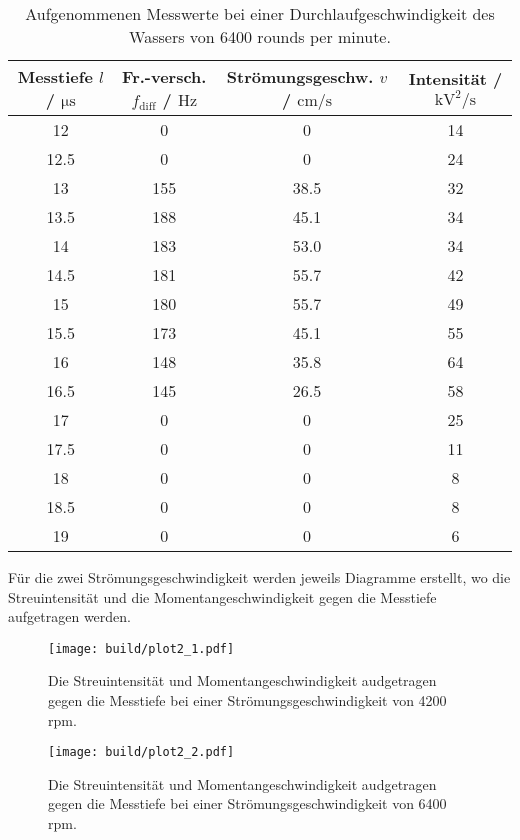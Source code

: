 \begin{table}
  \centering
  \begin{tabular}{c | c | c | c}
    \toprule
    Messtiefe $l$ / $\si{\micro\second}$ & Fr.-versch. $f_{\mathrm{diff}}$ / $\si{\hertz}$ & Strömungsgeschw. $v$ / $\si{\centi\meter\per\second}$ & Intensität / $\si{\kilo\volt\squared\per\second}$ \\
    \midrule
    12          &    0      &     0          &     14\\
    12.5        &    0      &     0          &     24\\
    13          &    155    &     38.5       &     32\\
    13.5        &    188    &     45.1       &     34\\
    14          &    183    &     53.0       &     34\\
    14.5        &    181    &     55.7       &     42\\
    15          &    180    &     55.7       &     49\\
    15.5        &    173    &     45.1       &     55\\
    16          &    148    &     35.8       &     64\\
    16.5        &    145    &     26.5       &     58\\          
    17          &    0      &     0          &     25\\
    17.5        &    0     &      0          &     11\\
    18          &    0     &      0          &     8\\
    18.5        &    0     &      0          &     8\\
    19          &    0     &      0          &     6\\
    \bottomrule
  \end{tabular}
  \caption{Aufgenommenen Messwerte bei einer Durchlaufgeschwindigkeit des Wassers von 6400 rounds per minute.}
  \label{tab:Teil2_70}
\end{table}

Für die zwei Strömungsgeschwindigkeit werden jeweils Diagramme erstellt, wo die Streuintensität
und die Momentangeschwindigkeit gegen die Messtiefe aufgetragen werden.\\

\begin{figure}
  \centering
  \texttt{[image: build/plot2\_1.pdf]}
  \caption{Die Streuintensität und Momentangeschwindigkeit audgetragen gegen die Messtiefe bei
  einer Strömungsgeschwindigkeit von 4200 rpm.}
  \label{fig:stroemung}
\end{figure}

\begin{figure}
  \centering
  \texttt{[image: build/plot2\_2.pdf]}
  \caption{Die Streuintensität und Momentangeschwindigkeit audgetragen gegen die Messtiefe bei
  einer Strömungsgeschwindigkeit von 6400 rpm.}
  \label{fig:stroemung}
\end{figure}